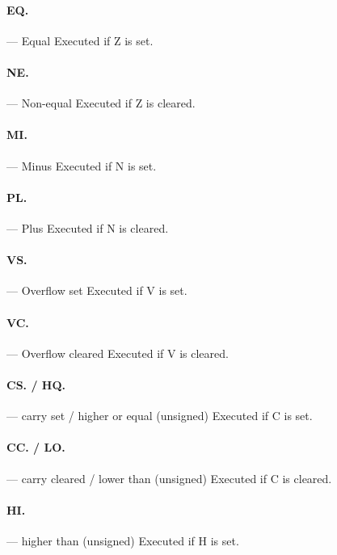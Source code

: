 \documentclass[11pt]{article}
\begin{document}
\paragraph{EQ.} --- Equal\newline
Executed if Z is set. 

\paragraph{NE.} --- Non-equal\newline
Executed if Z is cleared. 

\paragraph{MI.} --- Minus\newline
Executed if N is set. 

\paragraph{PL.} --- Plus\newline
Executed if N is cleared. 

\paragraph{VS.} --- Overflow set\newline
Executed if V is set. 

\paragraph{VC.} --- Overflow cleared\newline
Executed if V is cleared. 

\paragraph{CS. / HQ.} --- carry set / higher or equal (unsigned)\newline
Executed if C is set. 

\paragraph{CC. / LO.} --- carry cleared / lower than (unsigned)\newline
Executed if C is cleared. 

\paragraph{HI.} --- higher than (unsigned)\newline
Executed if H is set. 
\end{document}
